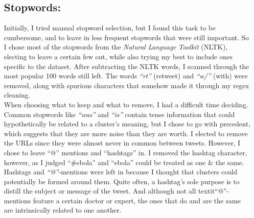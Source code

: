 \documentclass[fleqn]{article}
\begin{document}
\subsection{Stopwords:}
Initially, I tried manual stopword selection, but I found this task to be cumbersome, and to leave in less frequent stopwords that were still important.  So I chose most of the stopwords from the \textit{Natural Language Toolkit }(NLTK), electing to leave a certain few out, while also trying my best to include ones specific to the dataset.  After subtracting the NLTK words, I scanned through the most popular 100 words still left.  The words \textit{``rt''} (retweet) and \textit{``w/''} (with) were removed, along with spurious characters that somehow made it through my regex cleaning.\\
\newline
When choosing what to keep and what to remove, I had a difficult time deciding.  Common stopwords like \textit{``was''} and \textit{``is''} contain tense information that could hypothetically be related to a cluster's meaning, but I chose to go with precedent, which suggests that they are more noise than they are worth.  I elected to remove the URLs since they were almost never in common between tweets.  However, I chose to leave ``@'' mentions and ``hashtags'' in.  I removed the hashtag character, however, as I judged ``\#ebola'' and ``ebola'' could be treated as one \& the same. Hashtags and \textit{``@''}-mentions were left in because I thought that clusters could potentially be formed around them.  Quite often, a hashtag's sole purpose is to distill the subject or message of the tweet.  And although not all textit{``@''}-mentions feature a certain doctor or expert, the ones that do and are the same are intrinsically related to one another.
\end{document}
